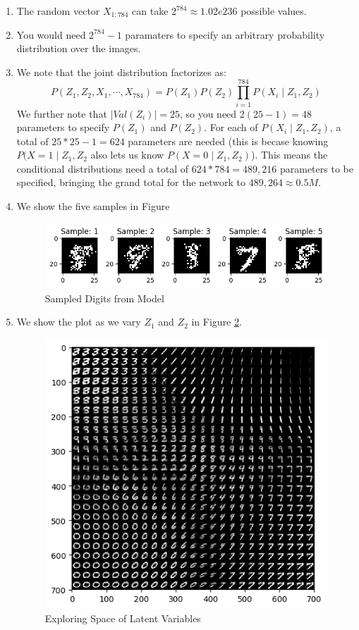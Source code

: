 \documentclass[12pt]{article}
\begin{document}
\begin{enumerate}
\item The random vector $X_{1:784}$ can take $2^{784} \approx 1.02e236$ possible values.
\item You would need $2^{784} - 1$ paramaters to specify an arbitrary probability distribution over the images.
\item We note that the joint distribution factorizes as:
$$
P(Z_1, Z_2, X_1, \cdots, X_{784}) = P(Z_1)P(Z_2)\prod_{i=1}^{784}P(X_i \mid Z_1, Z_2)
$$
We further note that $|Val(Z_i)| = 25$, so you need $2(25-1) = 48$ parameters to specify $P(Z_1)$ and $P(Z_2)$. For each of $P(X_i \mid Z_1, Z_2)$, a total of $25*25 - 1 = 624$ parameters are needed (this is becase knowing $P(X=1 \mid Z_1, Z_2$ also lets us know $P(X = 0 \mid Z_1, Z_2)$). This means the conditional distributions need a total of $624 * 784 = 489,216$ parameters to be specified, bringing the grand total for the network to $489,264 \approx 0.5M$.
\item We show the five samples in Figure 
\begin{figure}[h!]
\centering
\includegraphics[scale=0.8]{programming/a4.png}
\caption{Sampled Digits from Model}
\label{fig:sampled_digits}
\end{figure}

\item We show the plot as we vary $Z_1$ and $Z_2$ in Figure \ref{fig:latent_variables}.
\begin{figure}[h!]
\centering
\includegraphics[scale=0.8]{programming/a5.png}
\caption{Exploring Space of Latent Variables}
\label{fig:latent_variables}
\end{figure}


\end{enumerate}
\end{document}
